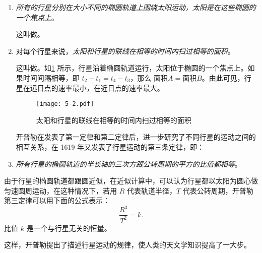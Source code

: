 \begin{enumerate}[1.]
	\item \emph{所有的行星分别在大小不同的椭圆轨道上围绕太阳运动，太阳是在这些椭圆的一个焦点上}。
	
	这叫做。
	\item 对每个行星来说，\emph{太阳和行星的联线在相等的时间内扫过相等的面积}。
	
	这叫做。如\cref{fig:5-2} 所示，行星沿着椭圆轨道运行，太阳位于椭圆的一个焦点上。如果时间间隔相等，即 $t_2-t_1=t_4-t_3$，那么 $\text{面积}A=\text{面积}B$。由此可见，行星在远日点的速率最小，在近日点的速率最大。

\begin{figure}
	\texttt{[image: 5-2.pdf]}
	\caption{太阳和行星的联线在相等的时间内扫过相等的面积}\label{fig:5-2}
\end{figure}

开普勒在发表了第一定律和第二定律后，进一步研究了不同行星的运动之间的相互关系，在 1619 年又发表了行星运动的第三条定律，即：

\item \emph{所有行星的椭圆轨道的半长轴的三次方跟公转周期的平方的比值都相等}。
\end{enumerate}

\bigskip
由于行星的椭圆轨道都跟圆近似，在近似计算中，可以认为行星都以太阳为圆心做匀速圆周运动，在这种情况下，若用 $R$ 代表轨道半径，$T$ 代表公转周期，开普勒第三定律可以用下面的公式表示：
\[\frac{R^3}{T^2}=k.\]
比值 $k$ 是一个与行星无关的恒量。

这样，开普勒提出了描述行星运动的规律，使人类的天文学知识提高了一大步。	
	
